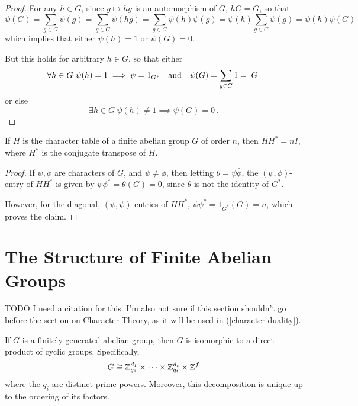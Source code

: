 \documentclass{report}
\begin{document}
    \begin{proof}
      For any $h \in G$, since $g \mapsto hg$ is an automorphism of $G$,
      $hG = G$, so that
      $$
        \psi(G) = \sum_{g \in G} \psi(g)
        = \sum_{g \in G} \psi(hg)
        = \sum_{g \in G} \psi(h) \psi(g)
        = \psi(h) \sum_{g \in G} \psi(g)
        = \psi(h) \psi(G)
      $$
      which implies that either $\psi(h) = 1$ or $\psi(G) = 0$.

      But this holds for arbitrary $h \in G$, so that either
      $$
        \forall h \in G\ \psi(h) = 1
        \implies \psi = 1_{G^*}
        \quad\text{and}\quad
        \psi(G) = \sum_{g \in G} 1 = \left\lvert G \right\rvert
      $$
      or else
      $$
        \exists h \in G\ \psi(h) \neq 1
        \implies \psi(G) = 0
        \ .
      $$
    \end{proof}

    \begin{cor}\label{character-table-unitary}
      If $H$ is the character table of a finite abelian group $G$ of order $n$,
      then $H H^* = nI$, where $H^*$ is the conjugate transpose of $H$.
    \end{cor}

    \begin{proof}
      If $\psi, \phi$ are characters of $G$, and $\psi \neq \phi$,
      then letting $\theta = \psi \bar{\phi}$, the $(\psi, \phi)$-entry of $HH^*$
      is given by $\psi \phi^* = \theta(G) = 0$, since $\theta$ is not the
      identity of $G^*$.

      However, for the diagonal, $(\psi, \psi)$-entries of $HH^*$,
      $\psi \psi^* = 1_{G^*}(G) = n$, which proves the claim.
    \end{proof}

  \section{The Structure of Finite Abelian Groups}
    TODO I need a citation for this.
    I'm also not sure if this section shouldn't go before the section on
    Character Theory, as it will be used in (\ref{character-duality}).

    \begin{thm}\label{structure-theorem}
      If $G$ is a finitely generated abelian group,
      then $G$ is isomorphic to a direct product of cyclic groups.
      Specifically,
      $$
        G \cong
        \mathbb{Z}_{q_1}^{d_1} \times \cdots \times \mathbb{Z}_{q_t}^{d_t}
        \times \mathbb{Z}^f
      $$
      where the $q_i$ are distinct prime powers.
      Moreover, this decomposition is unique up to the ordering of its factors.
    \end{thm}
\end{document}
